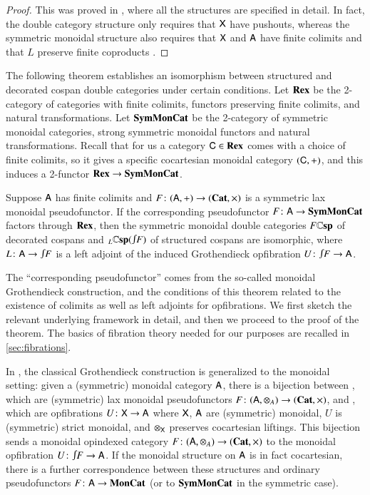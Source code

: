 \documentclass[reqno]{amsart}
\begin{document}
\begin{proof}
This was proved in \cite[Theorems~2.3 \& 3.9]{BC}, where all the structures are specified in detail.  In fact, the double category structure only requires that $\mathsf{X}$ have pushouts, whereas the symmetric monoidal structure also requires that $\mathsf{X}$ and $\mathsf{A}$ have finite colimits and that $L$ preserve finite coproducts \cite[Theorem~3.2.3]{CourserThesis}.
\end{proof}

The following theorem establishes an isomorphism between structured and decorated cospan double categories under certain conditions.  Let $\mathbf{Rex}$ be the 2-category of categories with finite colimits, functors preserving finite colimits, and natural transformations.  Let $\mathbf{SymMonCat}$ be the 2-category of symmetric monoidal categories, strong symmetric monoidal functors and natural transformations.   Recall that for us a category $\mathsf{C} \in \mathbf{Rex}$ comes with a choice of finite colimits, so it gives a specific cocartesian monoidal category $(\mathsf{C},+)$, and this induces a 2-functor $\mathbf{Rex} \to \mathbf{SymMonCat}$.

\begin{thm} \label{thm:equiv}
Suppose $\mathsf{A}$ has finite colimits and $F \colon (\mathsf{A},+) \to (\mathbf{Cat},\times)$ is a symmetric lax monoidal pseudofunctor. If the corresponding pseudofunctor $F \colon \mathsf{A} \to \mathbf{SymMonCat}$ factors through $\mathbf{Rex}$, then the symmetric monoidal double categories $F\mathbf{\mathbb Csp}$ of decorated cospans and $_L\lCsp(\inta F)$ of structured cospans are isomorphic, where $L \maps \A \to \inta F$ is a left adjoint of the induced Grothendieck opfibration $U\maps \inta F \to \A$.
\end{thm}

The ``corresponding pseudofunctor'' comes from the so-called monoidal Grothendieck construction, and the conditions of this theorem related to the existence of colimits as well as left adjoints for opfibrations. We first sketch the relevant underlying framework in detail, and then we proceed to the proof of the theorem. The basics of fibration theory needed for our purposes are recalled in \cref{sec:fibrations}. 

In \cite{MV}, the classical Grothendieck construction is generalized to the monoidal setting: given a (symmetric) monoidal category $\mathsf{A}$, there is a bijection between , which are (symmetric) lax monoidal pseudofunctors $F\colon (\mathsf{A}, \otimes_A) \to (\mathbf{Cat}, \times)$, and , which are opfibrations $U \colon \mathsf{X} \to \mathsf{A}$ where $\mathsf{X}$, $\mathsf{A}$ are (symmetric) monoidal, $U$ is (symmetric) strict monoidal, and $\otimes_{\mathsf{X}}$ preserves cocartesian liftings.   This bijection sends a monoidal opindexed category $F \colon (\mathsf{A},\otimes_A) \to (\mathbf{Cat}, \times)$ to the monoidal opfibration $U \maps \inta F \to \A$.  If the monoidal structure on $\mathsf{A}$ is in fact cocartesian, there is a further correspondence between these structures and ordinary pseudofunctors $F\colon \mathsf{A} \to \mathbf{MonCat}$ (or to $\mathbf{SymMonCat}$ in the symmetric case). 
\end{document}
